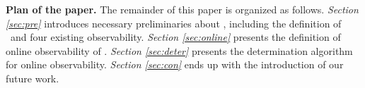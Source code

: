 \medskip\noindent
{\bf Plan of the paper.}
The remainder of this paper is organized as follows.
 {\em Section \ref{sec:pre}} introduces necessary preliminaries about \BCNs, including the definition of \BCNs\ and four existing observability. {\em Section \ref{sec:online}} presents the definition of online observability of \BCNs. {\em Section \ref{sec:deter}} presents the determination algorithm for online observability. 
 {\em Section \ref{sec:con}} ends up with the introduction of our future work.

